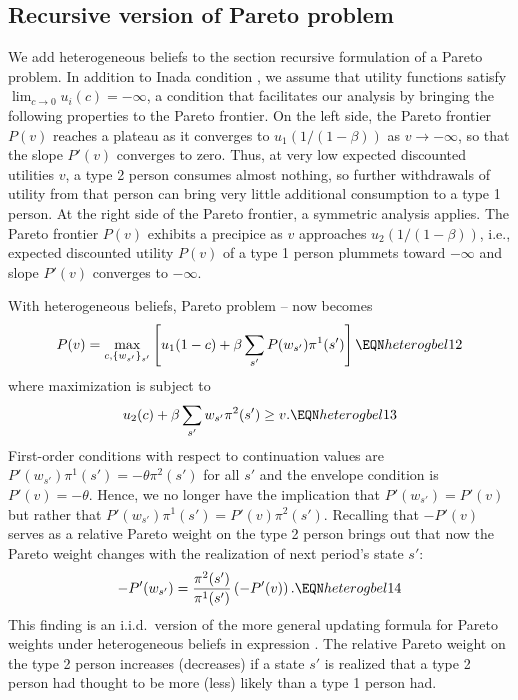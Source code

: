 \subsection{Recursive version of Pareto problem}
 We add heterogeneous beliefs to the section  recursive  formulation of a
Pareto problem.
In addition to Inada condition , we 
assume that utility functions satisfy 
$\lim_{c \rightarrow 0} u_i(c) = -\infty$, a condition that facilitates 
 our analysis by bringing the following 
properties to  the Pareto frontier. On the left 
side, the Pareto frontier $P(v)$ reaches a plateau 
as it converges to $u_1(1/(1-\beta))$ as 
$v \rightarrow -\infty$, so that the  slope $P'(v)$
converges to zero. Thus, at very  low 
expected discounted utilities $v$, a type 2 person
consumes almost nothing, so further withdrawals of utility from that person can bring 
 very little additional consumption  to
a type 1 person. %
At  
the right side of the Pareto frontier, a symmetric analysis  applies. The Pareto
frontier $P(v)$ exhibits a precipice as $v$ 
approaches $u_2(1/(1-\beta))$, i.e.,  expected
discounted utility $P(v)$ of a type 1 person
plummets toward $-\infty$ and  slope $P'(v)$
converges to $-\infty$.

With heterogeneous beliefs,
Pareto problem --
now becomes
$$ P(v) = \max_{c, \{w_{s'} \}_{s'} } \left[ u_1(1-c) 
   + \beta \sum_{s'} P(w_{s'}) \pi^1(s') \right] 
                                      \EQN heterogbel12 $$
where  maximization is subject to
$$ u_2(c) + \beta \sum_{s'} w_{s'} \pi^2(s') \geq v .
                                      \EQN heterogbel13 $$
First-order conditions with respect to continuation
values are $P'(w_{s'}) \pi^1(s') =- \theta \pi^2(s')$  
for all $s'$ and the envelope condition is 
$P'(v) = -\theta$. Hence, we no longer have the
implication that $P'(w_{s'})=P'(v)$ but rather that
$P'(w_{s'}) \pi^1(s') =P'(v) \pi^2(s')$.
Recalling  that $-P'(v)$ serves as a relative Pareto weight
on the type 2 person 
brings out that now the Pareto weight changes with
the realization of next period's state $s'$:
$$
-P'(w_{s'})= {\frac{\pi^2(s')}{\pi^1(s')}} 
              \left(-P'(v)\right) .     \EQN heterogbel14 $$
This finding is an i.i.d.\ version of the more general updating formula for  Pareto weights under heterogeneous 
beliefs in expression . 
The relative Pareto weight on the 
type 2 person increases (decreases) if a state $s'$
is realized that a type 2 person had thought
to be more (less) likely  than a type 1 person had. 

